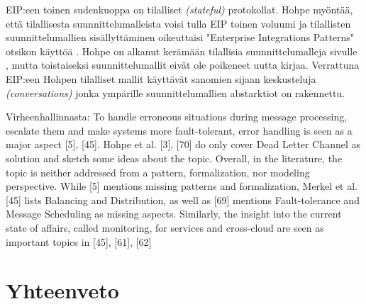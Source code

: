 EIP:een toinen sudenkuoppa on tilalliset \textit{(stateful)} protokollat. Hohpe myöntää, että tilallisesta suunnittelumalleista voisi tulla EIP toinen voluumi ja tilallisten suunnittelumallien sisällyttäminen oikeuttaisi "Enterprise Integrations Patterns" otsikon käyttöä \citep{Zimmermann2016}.
Hohpe on alkanut kerämään tilallisia suunnittelumalleja sivulle \citep{conversationPatterns}, mutta toistaiseksi suunnittelumallit eivät ole poikeneet uutta kirjaa. Verrattuna EIP:een Hohpen tilalliset mallit käyttävät sanomien sijaan keskusteluja \textit{(conversations)} jonka ympärille suunnittelumallien abstarktiot on rakennettu.



Virheenhallinnasta:
To handle erroneous situations during message processing, escalate them and make systems more fault-tolerant, error handling is seen as a major aspect [5], [45]. Hohpe et al. [3], [70] do only cover Dead Letter Channel as solution and sketch some ideas about the topic. Overall, in the literature, the topic is neither addressed from a pattern, formalization, nor modeling perspective. While [5] mentions missing patterns and formalization, Merkel et al. [45] lists Balancing and Distribution, as well as [69] mentions Fault-tolerance and Message Scheduling as missing aspects. Similarly, the insight into the current state of affairs, called monitoring, for services and cross-cloud are seen as important topics in [45], [61], [62]\citep{Ritter2017}




\chapter{Yhteenveto}
